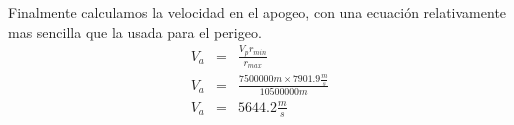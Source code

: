 \documentclass[12pt]{article}
\begin{document}
\begin{enumerate}
\begin{itemize}
Finalmente calculamos la velocidad en el apogeo, con una ecuación relativamente mas sencilla que la usada para el perigeo.\\
\begin{eqnarray}
V_a&=&\frac{V_p r_{min}}{r_{max}}\nonumber\\
V_a&=&\frac{7500000 m \times 7901.9 \frac{m}{s}}{10500000 m}\nonumber\\
V_a&=&5644.2 \frac{m}{s}\\
\nonumber
\end{eqnarray}
 
\end{itemize}

\end{enumerate}
\end{document}
